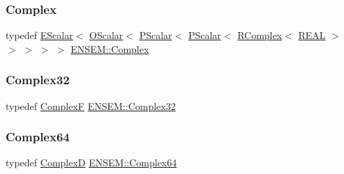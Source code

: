 \mbox{\label{group__defs_gabaa4aa11d5212d34042d08bf0b2f9cc0}} 
\subsubsection{\texorpdfstring{Complex}{Complex}}
{\footnotesize\ttfamily typedef \mbox{\hyperlink{classENSEM_1_1EScalar}{E\+Scalar}}$<$ \mbox{\hyperlink{classENSEM_1_1OScalar}{O\+Scalar}}$<$ \mbox{\hyperlink{classENSEM_1_1PScalar}{P\+Scalar}}$<$ \mbox{\hyperlink{classENSEM_1_1PScalar}{P\+Scalar}}$<$ \mbox{\hyperlink{classENSEM_1_1RComplex}{R\+Complex}}$<$ \mbox{\hyperlink{namespaceENSEM_a6dd9aa6508168f545c861787e63ddd1e}{R\+E\+AL}} $>$ $>$ $>$ $>$ $>$ \mbox{\hyperlink{group__defs_gabaa4aa11d5212d34042d08bf0b2f9cc0}{E\+N\+S\+E\+M\+::\+Complex}}}

\mbox{\label{group__defs_ga33929081b433314a8e5ae47f774c90b4}} 
\subsubsection{\texorpdfstring{Complex32}{Complex32}}
{\footnotesize\ttfamily typedef \mbox{\hyperlink{group__defs_ga9d343936e63ca257d34c7e2198e549d7}{ComplexF}} \mbox{\hyperlink{group__defs_ga33929081b433314a8e5ae47f774c90b4}{E\+N\+S\+E\+M\+::\+Complex32}}}

\mbox{\label{group__defs_gade5a0616c06f3019ee74a69dbb42258f}} 
\subsubsection{\texorpdfstring{Complex64}{Complex64}}
{\footnotesize\ttfamily typedef \mbox{\hyperlink{group__defs_gaf38ee8c84f090ee0c3b76e7a384fb316}{ComplexD}} \mbox{\hyperlink{group__defs_gade5a0616c06f3019ee74a69dbb42258f}{E\+N\+S\+E\+M\+::\+Complex64}}}

\mbox{\label{group__defs_gaf38ee8c84f090ee0c3b76e7a384fb316}} 
